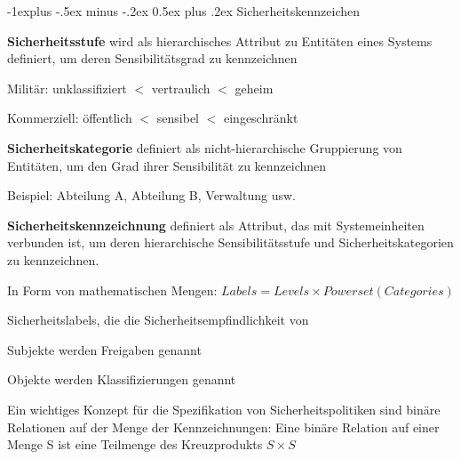 \documentclass[a4paper]{article}
\makeatletter
\renewcommand{\subsection}{\@startsection{subsection}{2}{0mm}%
 {-1explus -.5ex minus -.2ex}%
 {0.5ex plus .2ex}%
 {\normalfont\normalsize\bfseries}}
\makeatother
\begin{document}
\begin{multicols}{3}
      \subsection{Sicherheitskennzeichen}
      \begin{itemize*}
            \item \textbf{Sicherheitsstufe} wird als hierarchisches Attribut zu Entitäten eines Systems definiert, um deren Sensibilitätsgrad zu kennzeichnen
            \begin{itemize*}
                  \item Militär: unklassifiziert $<$ vertraulich $<$ geheim
                  \item Kommerziell: öffentlich $<$ sensibel $<$ eingeschränkt
            \end{itemize*}
            \item \textbf{Sicherheitskategorie} definiert als nicht-hierarchische Gruppierung von Entitäten, um den Grad ihrer Sensibilität zu kennzeichnen
            \begin{itemize*}
                  \item Beispiel: Abteilung A, Abteilung B, Verwaltung usw.
            \end{itemize*}
            \item \textbf{Sicherheitskennzeichnung} definiert als Attribut, das mit Systemeinheiten verbunden ist, um deren hierarchische Sensibilitätsstufe und Sicherheitskategorien zu kennzeichnen.
            \begin{itemize*}
                  \item In Form von mathematischen Mengen: $Labels = Levels \times Powerset(Categories)$
            \end{itemize*}
            \item Sicherheitslabels, die die Sicherheitsempfindlichkeit von
            \begin{itemize*}
                  \item Subjekte werden Freigaben genannt
                  \item Objekte werden Klassifizierungen genannt
            \end{itemize*}
            \item Ein wichtiges Konzept für die Spezifikation von Sicherheitspolitiken sind binäre Relationen auf der Menge der Kennzeichnungen: Eine binäre Relation auf einer Menge S ist eine Teilmenge des Kreuzprodukts $S\times S$
      \end{itemize*}


\end{multicols}
\end{document}
